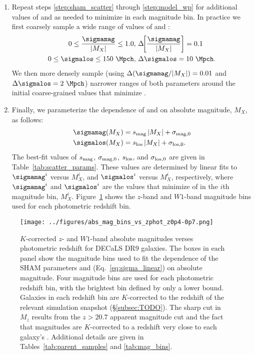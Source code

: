 \documentclass[twocolumn,apj,iop,tighten]{emulateapj2}
\begin{document}
\begin{enumerate}[leftmargin=0pt, itemindent=24pt, listparindent=10pt, label=(\arabic*), nosep]
%
\item \label{step:model_refine}
Repeat steps \ref{step:sham_scatter} through \ref{step:model_wp} for additional values of \sigmamag and \sigmalos as needed to minimize \chisqred in each magnitude bin. In practice we first coarsely sample a wide range of values of \sigmamag and \sigmalos:
%
\begin{subequations}
  \begin{align}
    0 \leq \frac{\sigmamag}{|M_X|} \leq 1.0,\ & \Delta \!\! \left[\frac{\sigmamag}{|M_X|}\right]=0.1 \\
    0 \leq \sigmalos \leq 150~\Mpch,\ & \Delta \sigmalos=10~\Mpch.
  \end{align}
\end{subequations}
%
\noindent We then more densely sample (using $\Delta(\sigmamag/|M_X|)=0.01$ and ${\Delta \sigmalos=2~\Mpch}$) narrower ranges of both parameters around the initial coarse-grained values that minimize \chisqred.
%
\item \label{step:sigma_linear}
Finally, we parameterize the dependence of \sigmamag and \sigmalos on absolute magnitude, $M_X$, as follows:
%
\begin{subequations}\label{eq:sigma_linear}
\begin{align}
  \sigmamag(M_X) &= s_{\rm mag}\, |M_X| + \sigma_{{\rm mag},0} \\
  \sigmalos(M_X) &= s_{\rm los}\, |M_X| + \sigma_{{\rm los},0}.
\end{align}
\end{subequations}
%
\noindent The best-fit values of $s_{\rm mag}$, $\sigma_{{\rm mag},0}$, $s_{\rm los}$, and $\sigma_{{\rm los},0}$ are given in Table~\ref{tab:scatter_params}. These values are determined by linear fits to $\sigmamag^i$ versus $M^i_X$, and $\sigmalos^i$ versus $M^i_X$, respectively, where $\sigmamag^i$ and $\sigmalos^i$ are the values that minimize \chisqred of \wprp in the $i$th magnitude bin, $M^i_X$. Figure~\ref{fig:zphot_mag-bins} shows the $z$-band and $W1$-band magnitude bins used for each photometric redshift bin.
\end{enumerate}

\begin{figure}
\centering
\texttt{[image: ../figures/abs\_mag\_bins\_vs\_zphot\_z0p4-0p7.png]}
\caption{$K$-corrected $z$- and $W1$-band absolute magnitudes verses photometric redshift for DECaLS DR9 galaxies. The boxes in each panel show the magnitude bins used to fit the dependence of the SHAM parameters \sigmamag and \sigmalos (Eq.~\ref{eq:sigma_linear}) on absolute magnitude. Four magnitude bins are used for each photometric redshift bin, with the brightest bin defined by only a lower bound. Galaxies in each redshift bin are $K$-corrected to the redshift of the relevant simulation snapshot (\S\ref{subsec:TODO}). The sharp cut in $M_z$ results from the $z > 20.7$ apparent magnitude cut and the fact that magnitudes are $K$-corrected to a redshift very close to each galaxy's \zphot. Additional details are given in Tables~\ref{tab:parent_samples} and \ref{tab:mag_bins}.
}
\label{fig:zphot_mag-bins}
\end{figure}
\end{document}
